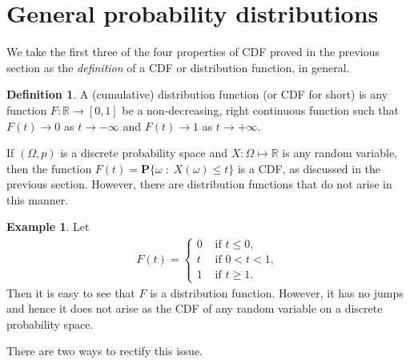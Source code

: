 \documentclass[preprint,  11pt]{amsart}
\theoremstyle{plain} %
\theoremstyle{definition} %
\newtheorem{definition}[theorem]{Definition}
\newtheorem{example}[theorem]{Example}
\begin{document}
\section{General probability distributions}
We take the first three of the four properties of CDF proved in the previous section as the {\em definition} of a CDF or distribution function, in general.
\begin{definition} A (cumulative) distribution function (or CDF for short) is any function $F:\mathbb{R}\rightarrow [0,1]$ be a non-decreasing, right continuous function such that $F(t)\rightarrow 0$ as $t\rightarrow -\infty$ and $F(t)\rightarrow 1$ as $t\rightarrow +\infty$.
\end{definition}
If $(\Omega,p)$ is a discrete probability space and $X:\Omega\mapsto \mathbb{R}$ is any random variable, then the function $F(t)=\mathbf{P}\{\omega{\; : \;} X(\omega)\le t\}$ is a CDF, as discussed in the previous section. However, there are distribution functions that do not arise in this manner.
\begin{example}\label{eg:uniformcf} Let 
\[\begin{aligned}
F(t)=\begin{cases} 0 & \mbox{ if } t\le 0, \\ t &\mbox{ if }0<t<1, \\ 1 &\mbox{ if }t\ge 1. \end{cases}
\end{aligned}\]
Then it is easy to see that $F$ is a distribution function. However, it has no jumps and hence it does not arise as the CDF of any random variable on a discrete probability space. 
\end{example}
There are two ways to rectify this issue.
\end{document}
